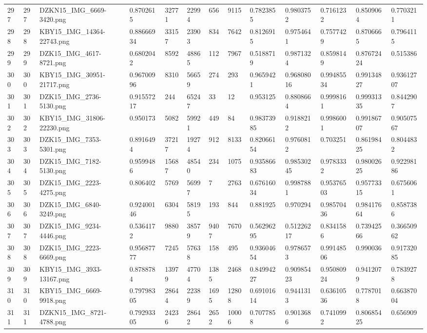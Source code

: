 \documentclass[11pt, a4paper, twoside]{report}
\begin{document}
\begin{longtable}[c]{@{}lllllllllllll@{}}
297 & 297 & DZKN15\_IMG\_6669-3420.png & 0.8702615 & 32771 & 22994 & 656 & 9115 & 0.7823855 & 0.9803752 & 0.7161232 & 0.8509064 & 0.7703211 \\
298 & 298 & KBY15\_IMG\_14364-22743.png & 0.88666934 & 33157 & 23903 & 834 & 7642 & 0.8126915 & 0.9754641 & 0.7577429 & 0.8706665 & 0.7964115 \\
299 & 299 & DZK15\_IMG\_4617-8721.png & 0.6802042 & 8592 & 48865 & 112 & 7967 & 0.5188719 & 0.9871324 & 0.8598149 & 0.87672424 & 0.515386 \\
300 & 300 & KBY15\_IMG\_30951-21717.png & 0.96700996 & 8310 & 56659 & 274 & 293 & 0.9659421 & 0.96808016 & 0.99485534 & 0.99134827 & 0.93612707 \\
301 & 301 & DZK15\_IMG\_2736-5130.png & 0.91557217 & 244 & 65247 & 33 & 12 & 0.953125 & 0.8808664 & 0.9998161 & 0.99931335 & 0.8442907 \\
302 & 302 & KBY15\_IMG\_31806-22230.png & 0.950173 & 5082 & 59921 & 449 & 84 & 0.98373985 & 0.9188212 & 0.9986001 & 0.99186707 & 0.90507567 \\
303 & 303 & DZK15\_IMG\_7353-5301.png & 0.8916494 & 37217 & 19274 & 912 & 8133 & 0.82066154 & 0.9760812 & 0.703251 & 0.86198425 & 0.8044832 \\
304 & 304 & DZK15\_IMG\_7182-5130.png & 0.9599486 & 15687 & 48540 & 234 & 1075 & 0.93586683 & 0.98530245 & 0.9783332 & 0.98002625 & 0.92298186 \\
305 & 305 & DZK15\_IMG\_2223-4275.png & 0.806402 & 5769 & 56997 & 7 & 2763 & 0.67616034 & 0.9987881 & 0.95376503 & 0.95773315 & 0.6756061 \\
306 & 306 & DZK15\_IMG\_6840-3249.png & 0.92400146 & 6304 & 58195 & 193 & 844 & 0.881925 & 0.970294 & 0.98570436 & 0.98417664 & 0.8587386 \\
307 & 307 & DZK15\_IMG\_9234-4446.png & 0.5364172 & 9880 & 38579 & 9407 & 7670 & 0.56296295 & 0.51226217 & 0.8341586 & 0.73942566 & 0.36650962 \\
308 & 308 & DZK15\_IMG\_2223-6669.png & 0.95687777 & 7245 & 57638 & 158 & 495 & 0.93604654 & 0.9786573 & 0.99148506 & 0.990036 & 0.91732085 \\
309 & 309 & KBY15\_IMG\_3933-13167.png & 0.8788784 & 13979 & 47704 & 1385 & 2468 & 0.84994227 & 0.90985423 & 0.95080924 & 0.9412079 & 0.7839278 \\
310 & 310 & KBY15\_IMG\_6669-9918.png & 0.79798305 & 28644 & 22389 & 1695 & 12808 & 0.69101614 & 0.9441313 & 0.63610536 & 0.7787018 & 0.66387004 \\
311 & 311 & DZKN15\_IMG\_8721-4788.png & 0.79293305 & 24236 & 28642 & 2652 & 10006 & 0.7077858 & 0.9013686 & 0.7410992 & 0.80685425 & 0.656909 \\

\end{longtable}
\end{document}
